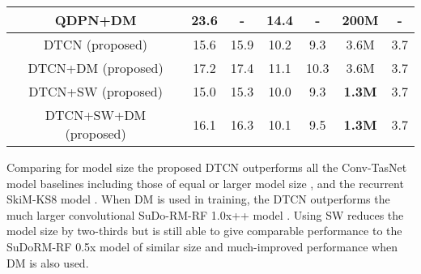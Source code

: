 \documentclass{article}
\begin{document}
\begin{table*}[!t]
\begin{tabular}{c|cc|cc|c|c}
QDPN+DM \cite{QDPN}                 & \textbf{23.6}                & -                 & \textbf{14.4}              & -               & 200M                &       -             \\ 
\hline
DTCN (proposed)                     &          15.6           &           15.9        & 10.2              & 9.3            & 3.6M                &       3.7            \\
DTCN+DM (proposed)                  &      17.2               &         17.4          &        11.1           &       10.3          & 3.6M                &      3.7              \\
DTCN+SW (proposed)               &       15.0             &       15.3            &      10.0             &       9.3          & \textbf{1.3M}                &         3.7           \\
DTCN+SW+DM (proposed)               &       16.1              &          16.3         &        10.1           &        9.5       & \textbf{1.3M }               &       3.7      \\\hline      
\end{tabular}
\end{table*} Comparing for model size the proposed \ac{DTCN} outperforms all the Conv-TasNet model baselines including those of equal or larger model size \cite{convtasnet}, and the recurrent SkiM-KS8 model \cite{skim}. When \ac{DM} is used in training, the \ac{DTCN} outperforms the much larger convolutional SuDo-RM-RF 1.0x++ model \cite{sudormrf}. Using \ac{SW} reduces the model size by two-thirds but is still able to give comparable performance to the SuDoRM-RF 0.5x model of similar size and much-improved performance when \ac{DM} is also used.
\end{document}
